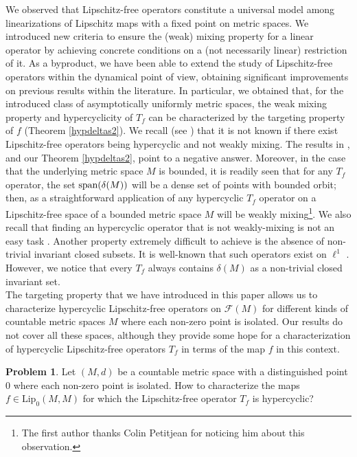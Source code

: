 \documentclass[12pt,english]{amsart}
\numberwithin{equation}{section}
\theoremstyle{plain}
\theoremstyle{definition}
\newtheorem{problem}[theorem]{Problem}
\def\dd{\delta}
\newcommand{\free}[1]{\mathcal{F}(#1)}
\def\lip{ \text{Lip}}
\def\sp{\hbox{{\rm span}}}
\begin{document}
We observed that Lipschitz-free operators constitute a universal model among linearizations of Lipschitz maps with a fixed point on metric spaces. 
We introduced new criteria to ensure the (weak) mixing property for a linear operator by achieving concrete conditions on a (not necessarily linear) restriction of it. As a byproduct, we have been able to extend the study of Lipschitz-free operators within the dynamical point of view, obtaining significant improvements on previous results within the literature. In particular, we obtained that, for the introduced class of asymptotically uniformly metric spaces, the weak mixing property and hypercyclicity of $T_f$ can be characterized by the targeting property of $f$ (Theorem \ref{hypdeltas2}). We recall (see \cite{ACP21}) that it is not  known if there exist Lipschitz-free operators being hypercyclic and not weakly mixing. 
The results in \cite{ACP21}, and our Theorem \ref{hypdeltas2}, point to a negative answer. Moreover, in the case that the underlying metric space $M$ is bounded, it is readily seen that for any $T_f$ operator, the set $\sp(\dd(M))$ will be a dense set of points with bounded orbit; then, as a straightforward application of \cite[Theorem 2.48]{GEP11} any hypercyclic $T_f$ operator on a Lipschitz-free space of a bounded metric space  $M$ will be weakly mixing\footnote{The first author thanks Colin Petitjean for noticing him about this observation.}. 
We also recall that finding an hypercyclic operator that is not weakly-mixing is not an easy task \cite{RosaRead}. Another property extremely difficult to achieve is the absence of non-trivial invariant closed subsets. It is well-known that such operators exist on $\ell^1$ \cite{Read}. However, we notice that every $T_f$ always contains $\dd(M)$ as a non-trivial closed invariant set.\\

The targeting property  that we have introduced in this paper allows us to characterize hypercyclic Lipschitz-free operators on $\free{M}$ for different kinds of countable metric spaces $M$ where each non-zero point is isolated. Our results do not cover all these spaces, although they provide some hope for a characterization of hypercyclic Lipschitz-free operators $T_f$ in terms of the map $f$ in this context. 

\begin{problem}
Let $(M,d)$ be a countable metric space with a distinguished point $0$ where each non-zero point is isolated. How to characterize the maps $f\in \lip_0(M,M)$ for which the Lipschitz-free operator $T_f$ is hypercyclic? 
\end{problem}
\end{document}
